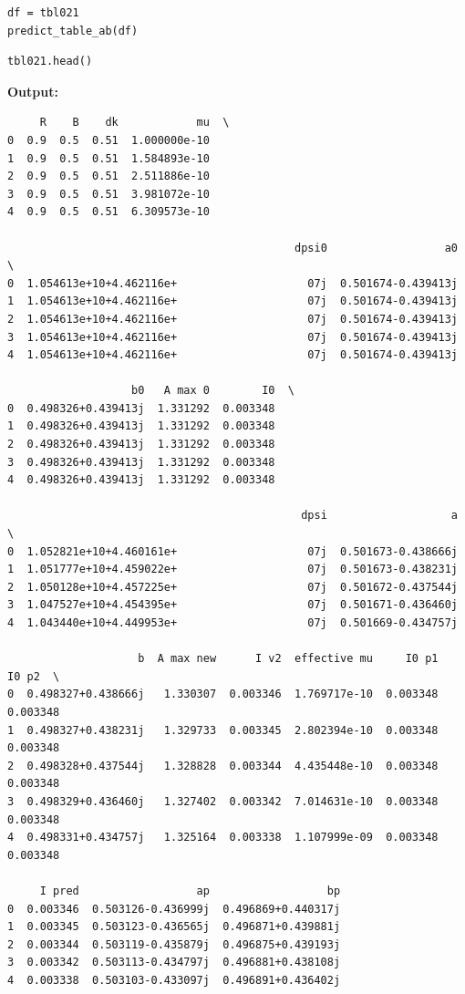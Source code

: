 \documentclass{article}
\begin{document}
\begin{lstlisting}
df = tbl021
predict_table_ab(df)\end{lstlisting}

\begin{lstlisting}
tbl021.head()\end{lstlisting}

\textbf{Output:}\begin{verbatim}
     R    B    dk            mu  \
0  0.9  0.5  0.51  1.000000e-10   
1  0.9  0.5  0.51  1.584893e-10   
2  0.9  0.5  0.51  2.511886e-10   
3  0.9  0.5  0.51  3.981072e-10   
4  0.9  0.5  0.51  6.309573e-10   

                                            dpsi0                  a0  \
0  1.054613e+10+4.462116e+                    07j  0.501674-0.439413j   
1  1.054613e+10+4.462116e+                    07j  0.501674-0.439413j   
2  1.054613e+10+4.462116e+                    07j  0.501674-0.439413j   
3  1.054613e+10+4.462116e+                    07j  0.501674-0.439413j   
4  1.054613e+10+4.462116e+                    07j  0.501674-0.439413j   

                   b0   A max 0        I0  \
0  0.498326+0.439413j  1.331292  0.003348   
1  0.498326+0.439413j  1.331292  0.003348   
2  0.498326+0.439413j  1.331292  0.003348   
3  0.498326+0.439413j  1.331292  0.003348   
4  0.498326+0.439413j  1.331292  0.003348   

                                             dpsi                   a  \
0  1.052821e+10+4.460161e+                    07j  0.501673-0.438666j   
1  1.051777e+10+4.459022e+                    07j  0.501673-0.438231j   
2  1.050128e+10+4.457225e+                    07j  0.501672-0.437544j   
3  1.047527e+10+4.454395e+                    07j  0.501671-0.436460j   
4  1.043440e+10+4.449953e+                    07j  0.501669-0.434757j   

                    b  A max new      I v2  effective mu     I0 p1     I0 p2  \
0  0.498327+0.438666j   1.330307  0.003346  1.769717e-10  0.003348  0.003348   
1  0.498327+0.438231j   1.329733  0.003345  2.802394e-10  0.003348  0.003348   
2  0.498328+0.437544j   1.328828  0.003344  4.435448e-10  0.003348  0.003348   
3  0.498329+0.436460j   1.327402  0.003342  7.014631e-10  0.003348  0.003348   
4  0.498331+0.434757j   1.325164  0.003338  1.107999e-09  0.003348  0.003348   

     I pred                  ap                  bp  
0  0.003346  0.503126-0.436999j  0.496869+0.440317j  
1  0.003345  0.503123-0.436565j  0.496871+0.439881j  
2  0.003344  0.503119-0.435879j  0.496875+0.439193j  
3  0.003342  0.503113-0.434797j  0.496881+0.438108j  
4  0.003338  0.503103-0.433097j  0.496891+0.436402j  
\end{verbatim}
\end{document}
